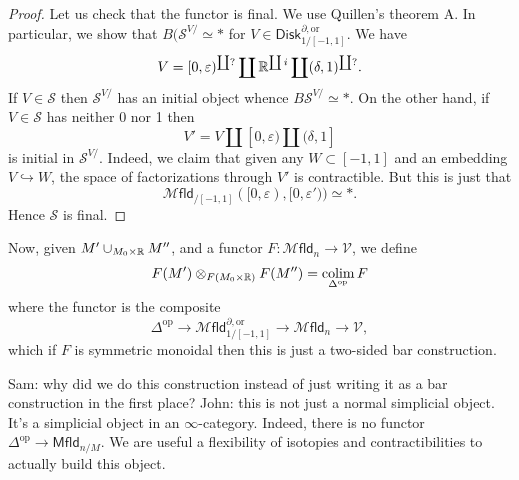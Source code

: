 \documentclass{amsart}
\newcommand{\mfld}{\mathscr{M}\mathsf{fld}_n}
\begin{document}
\begin{proof}
    Let us check that the functor is final. We use Quillen's theorem A. In particular, we show that
    $B(\mathcal{S}^{V/}\simeq *$ for $V\in\mathsf{Disk}_{1/[-1,1]}^{\partial,\text{or}}$. We have
    \begin{equation*}
        V=[0,\varepsilon)^{\coprod ?} \coprod \mathbb{R}^{\coprod i}\coprod (\delta,1)^{\coprod ?}.
    \end{equation*}
    If $V\in \mathcal{S}$ then $\mathcal{S}^{V/}$ has an initial object whence $B\mathcal{S}^{V/}\simeq *$.
    On the other hand, if $V\in\mathcal{S}$ has neither 0 nor 1 then
    \begin{equation*}
        V' = V\coprod [0,\varepsilon) \coprod (\delta,1]
    \end{equation*}
    is initial in $\mathcal{S}^{V/}$. Indeed, we claim that given any $W\subset [-1,1]$ and an embedding
    $V\hookrightarrow W$, the space of factorizations through $V'$ is contractible.
    But this is just that
    \begin{equation*}
        \mathcal{M}\mathsf{fld}_{/[-1,1]}([0,\varepsilon),[0,\varepsilon'))\simeq *.
    \end{equation*}
    Hence $\mathcal{S}$ is final.
\end{proof}

Now, given $M'\cup_{M_0\times\mathbb{R}}M''$, and a functor $F:\mfld\to \mathcal{V}$, we define
\begin{equation*}
    F(M')\otimes_{F(M_0\times\mathbb{R})}F(M'')=\operatorname*{colim}_{\Delta^\text{op}}F
\end{equation*}
where the functor is the composite
\begin{equation*}
    \Delta^\text{op}\to \mathcal{M}\mathsf{fld}_{1/[-1,1]}^{\partial, \text{or}}\to \mfld\to \mathcal{V},
\end{equation*}
which if $F$ is symmetric monoidal then this is just a two-sided bar construction.

Sam: why did we do this construction instead of just writing it as a bar construction
in the first place?
John: this is not just a normal simplicial object. It's a simplicial object in an
$\infty$-category. Indeed, there is no functor $\Delta^\text{op}\to \mathsf{Mfld}_{n/M}$. We
are useful a flexibility of isotopies and contractibilities to actually build this object.
\end{document}
